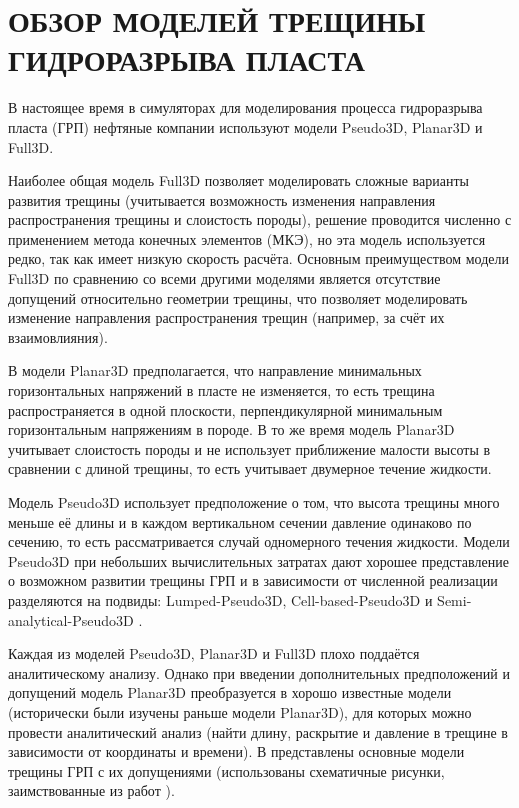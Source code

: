 \chapter{ОБЗОР МОДЕЛЕЙ ТРЕЩИНЫ ГИДРОРАЗРЫВА ПЛАСТА} \label{ch1}

В настоящее время в симуляторах для моделирования процесса гидроразрыва пласта (ГРП) нефтяные компании используют модели Pseudo3D, Planar3D и Full3D.

Наиболее общая модель Full3D позволяет моделировать сложные варианты развития трещины (учитывается возможность изменения направления распространения трещины и слоистость породы), решение проводится численно с применением метода конечных элементов (МКЭ), но эта модель используется редко, так как имеет низкую скорость расчёта.
Основным преимуществом модели Full3D по сравнению со всеми другими моделями является отсутствие допущений относительно геометрии трещины, что позволяет моделировать изменение направления распространения трещин (например, за счёт их взаимовлияния).

В модели Planar3D предполагается, что направление минимальных горизонтальных напряжений в пласте не изменяется, то есть трещина распространяется в одной плоскости, перпендикулярной минимальным горизонтальным напряжениям в породе.
В то же время модель Planar3D учитывает слоистость породы и не использует приближение малости высоты в сравнении с длиной трещины, то есть учитывает двумерное течение жидкости.

Модель Pseudo3D использует предположение о том, что высота трещины много меньше её длины и в каждом вертикальном сечении давление одинаково по сечению, то есть рассматривается случай одномерного течения жидкости.
Модели Pseudo3D при небольших вычислительных затратах дают хорошее представление о возможном развитии трещины ГРП и в зависимости от численной реализации разделяются на подвиды: Lumped-Pseudo3D, Cell-based-Pseudo3D \cite{adachi} и Semi-analytical-Pseudo3D \cite{shel_paderin}.

Каждая из моделей Pseudo3D, Planar3D и Full3D плохо поддаётся аналитическому анализу.
Однако при введении дополнительных предположений и допущений модель Planar3D преобразуется в хорошо известные модели (исторически были изучены раньше модели Planar3D), для которых можно провести аналитический анализ (найти длину, раскрытие и давление в трещине в зависимости от координаты и времени).
В  представлены основные модели трещины ГРП с их допущениями (использованы схематичные рисунки, заимствованные из работ \cite{adachi, dontsov_peirce, valov_baykin_dontsov, baykin_course}).

